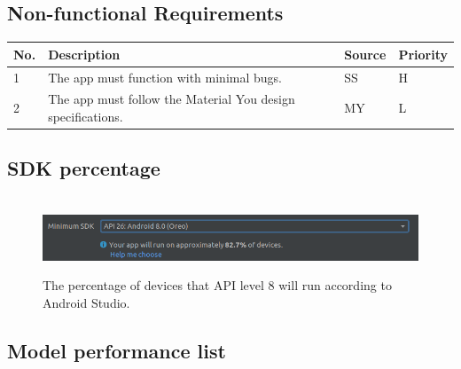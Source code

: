 \documentclass[12pt,a4paper]{report}
\begin{document}
\subsection{Non-functional Requirements}
\label{subsec:nonreq}

\begin{table}[h!]
    \begin{tabular}{ |l|l|l|l| }
        \hline
        No. & Description & Source & Priority \\
        \hline
        1 & 
        The app must function with minimal bugs. 
        & SS & H \\
        \hline
        2 & 
        The app must follow the Material You design specifications.
        & MY & L \\
        \hline
    \end{tabular}
    \label{table:nonfunc}
\end{table}

\subsection{SDK percentage}

\label{subsec:sdk}

\begin{figure}[h]\
    \centering
    \includegraphics[width=\textwidth]{Min_SDK.png}
    \caption{The percentage of devices that API level 8 will run according to Android Studio.}
    \label{fig:sdk}
\end{figure}

\clearpage

\subsection{Model performance list}

\label{subsec:models}
\end{document}
